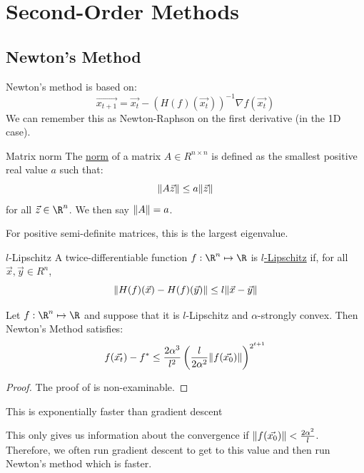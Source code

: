 \documentclass[../Main.tex]{subfiles}
\begin{document}
\section{Second-Order Methods}
\subsection{Newton's Method}
Newton's method is based on:
\begin{equation}
    \vec{x_{t+1}} = \vec{x_t} - \left(H(f)(\vec{x_{t}})\right)^{-1} \nabla f(\vec{x_{t}})
    \label{eqnNewtonMethod}
\end{equation}
We can remember this as Newton-Raphson on the first derivative (in the 1D case).
\begin{definition}{Matrix norm}
    The \underline{norm} of a matrix $A \in R^{n \times n}$ is defined as the smallest positive real value $a$ such that:
    \begin{equation*}
        \lVert A\vec{z}\rVert \leq a\lVert\vec{z}\rVert
    \end{equation*}
    for all $\vec{z} \in \R^n$. We then say $\lVert A\rVert = a$.
\end{definition}
\begin{remark}
    For positive semi-definite matrices, this is the largest eigenvalue.
\end{remark}
\begin{definition}{$l$-Lipschitz}
    A twice-differentiable function $f : \R^n \mapsto \R$ is \underline{$l$-Lipschitz} if, for all $\vec{x}, \vec{y} \in R^n$,
    \begin{equation*}
        \lVert H(f)(\vec{x}) - H(f)(\vec{y})\rVert \leq l\lVert\vec{x} - \vec{y}\rVert
    \end{equation*}
\end{definition}
\begin{theorem}
    Let $f : \R^n \mapsto \R$ and suppose that it is $l$-Lipschitz and $\alpha$-strongly convex. Then Newton's Method satisfies:
    \begin{equation*}
        f(\vec{x_{t}}) - f^* \leq \frac{2\alpha^3}{l^2} \left(\frac{l}{2\alpha^2} \lVert f(\vec{x_{0}})\rVert\right)^{2^{t+1}}
    \end{equation*}
    \label{thmNewtonConvergence}
\end{theorem}
\begin{proof}
    The proof of  is non-examinable.
\end{proof}
\begin{remarks}
    \item This is exponentially faster than gradient descent
    \item This only gives us information about the convergence if $\lVert f(\vec{x_{0}})\rVert < \frac{2\alpha^2}{l}$. Therefore, we often run gradient descent to get to this value and then run Newton's method which is faster.
\end{remarks}
\end{document}
